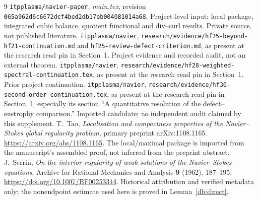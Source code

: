 \documentclass[11pt,a4paper]{article}
\theoremstyle{definition}\newtheorem{hypothesis}[theorem]{Hypothesis}
\theoremstyle{remark}\newtheorem{remark}[theorem]{Remark}
\numberwithin{equation}{section}
\begin{document}
\begin{thebibliography}{9}
 \texttt{itpplasma/navier-paper}, \emph{main.tex}, revision
\nolinkurl{065a962d6c6672dcf4bed2db17eb004081014a68}.
Project-level input: local package, integrated cubic balance, quotient
functional and div--curl results. Private source, not published literature.
 \texttt{itpplasma/navier},
\nolinkurl{research/evidence/hf25-beyond-hf21-continuation.md} and
\nolinkurl{hf25-review-defect-criterion.md}, as present at the research read pin
in Section~1. Project evidence and recorded audit, not an external theorem.
 \texttt{itpplasma/navier},
\nolinkurl{research/evidence/hf28-weighted-spectral-continuation.tex},
as present at the research read pin in Section~1. Prior project continuation.
 \texttt{itpplasma/navier},
\nolinkurl{research/evidence/hf30-second-order-continuation.tex},
as present at the research read pin in Section~1, especially its section ``A quantitative resolution of the defect--enstrophy comparison.''
Imported candidate; no independent audit claimed by this supplement.
 T.~Tao, \emph{Localisation and compactness properties of the
Navier--Stokes global regularity problem}, primary preprint arXiv:1108.1165.
\url{https://arxiv.org/abs/1108.1165}.
The local/maximal package is imported from the manuscript's assembled proof,
not inferred from the preprint abstract.
 J.~Serrin, \emph{On the interior regularity of weak solutions
of the Navier--Stokes equations}, Archive for Rational Mechanics and Analysis
\textbf{9} (1962), 187--195. \url{https://doi.org/10.1007/BF00253344}.
Historical attribution and verified metadata only; the nonendpoint estimate
used here is proved in Lemma~\ref{db:direct}.
\end{thebibliography}
\end{document}
